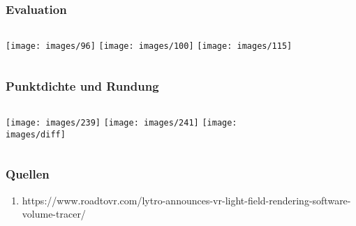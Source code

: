 \documentclass[aspectratio=169]{beamer}
\begin{document}
\begin{frame}
    \frametitle{Evaluation}

    \begin{columns}
        \texttt{[image: images/96]}
        \texttt{[image: images/100]}
        \texttt{[image: images/115]}
    \end{columns}
\end{frame}

\begin{frame}
    \frametitle{Punktdichte und Rundung}
    \begin{columns}
    \centering
    \texttt{[image: images/239]}%
    \texttt{[image: images/241]}
    \texttt{[image: images/diff]}
    
        \begin{figure}
            \centering
                \label{fig:umlquerylife}
            \end{figure}
        \end{columns}
\end{frame}

\begin{frame}
    \frametitle{Quellen}
    
    \begin{enumerate}
        \item https://www.roadtovr.com/lytro-announces-vr-light-field-rendering-software-volume-tracer/
    \end{enumerate}
\end{frame}
\end{document}
